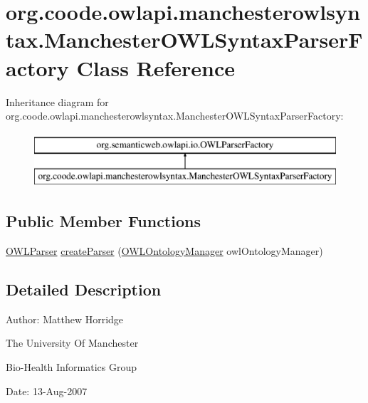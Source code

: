 \hypertarget{classorg_1_1coode_1_1owlapi_1_1manchesterowlsyntax_1_1_manchester_o_w_l_syntax_parser_factory}{\section{org.\-coode.\-owlapi.\-manchesterowlsyntax.\-Manchester\-O\-W\-L\-Syntax\-Parser\-Factory Class Reference}
\label{classorg_1_1coode_1_1owlapi_1_1manchesterowlsyntax_1_1_manchester_o_w_l_syntax_parser_factory}
}
Inheritance diagram for org.\-coode.\-owlapi.\-manchesterowlsyntax.\-Manchester\-O\-W\-L\-Syntax\-Parser\-Factory\-:\begin{figure}[H]
\begin{center}
\leavevmode
\includegraphics[height=2.000000cm]{classorg_1_1coode_1_1owlapi_1_1manchesterowlsyntax_1_1_manchester_o_w_l_syntax_parser_factory}
\end{center}
\end{figure}
\subsection*{Public Member Functions}
\begin{DoxyCompactItemize}
\item 
\hyperlink{interfaceorg_1_1semanticweb_1_1owlapi_1_1io_1_1_o_w_l_parser}{O\-W\-L\-Parser} \hyperlink{classorg_1_1coode_1_1owlapi_1_1manchesterowlsyntax_1_1_manchester_o_w_l_syntax_parser_factory_a89d2b8a59b1770e6fa461f85305c7da5}{create\-Parser} (\hyperlink{interfaceorg_1_1semanticweb_1_1owlapi_1_1model_1_1_o_w_l_ontology_manager}{O\-W\-L\-Ontology\-Manager} owl\-Ontology\-Manager)
\end{DoxyCompactItemize}


\subsection{Detailed Description}
Author\-: Matthew Horridge\par
 The University Of Manchester\par
 Bio-\/\-Health Informatics Group\par
 Date\-: 13-\/\-Aug-\/2007\par
\par
 

